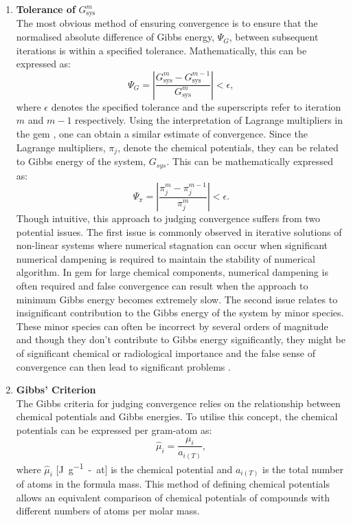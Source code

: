 	\begin{enumerate}
		\item \textbf{Tolerance of} $G_\text{sys}^m$\\
		The most obvious method of ensuring convergence is to ensure that the normalised absolute difference of Gibbs energy, $\Psi_G$, between subsequent iterations is within a specified tolerance. Mathematically, this can be expressed as:
		\begin{equation}\label{eqn:conv1}
			\Psi_G = \left \vert \frac{G_\text{sys}^{m} - G_\text{sys}^{m-1}}{G_\text{sys}^{m}} \right \vert < \epsilon,
		\end{equation}
		where $\epsilon$ denotes the specified tolerance and the superscripts refer to iteration $m$ and $m-1$ respectively. Using the interpretation of Lagrange multipliers in the \gls{gem} \cite{White:58}, one can obtain a similar estimate of convergence. Since the Lagrange multipliers, $\pi_{j}$, denote the chemical potentials, they can be related to Gibbs energy of the system, $G_{sys}$. This can be mathematically expressed as:
		\begin{equation}\label{eqn:conv2}
			\Psi_{\pi} = \left \vert \frac{\pi_{j}^{m} - \pi_{j}^{m-1}}{\pi_{j}^{m}} \right \vert < \epsilon.
		\end{equation}
		Though intuitive, this approach to judging convergence suffers from two potential issues. The first issue is commonly observed in iterative solutions of non-linear systems where numerical stagnation can occur when significant numerical dampening is required to maintain the stability of numerical algorithm. In \gls{gem} for large chemical components, numerical dampening is often required and false convergence can result when the approach to minimum Gibbs energy becomes extremely slow.  The second issue relates to insignificant contribution to the Gibbs energy of the system  by minor species. These minor species can often be incorrect by several orders of magnitude and though they don't contribute to Gibbs energy significantly, they might be of significant chemical or radiological importance and the false sense of convergence can then lead to significant problems \cite{Piro11a}.

		\item \textbf{Gibbs' Criterion}\\
	 The Gibbs criteria for judging convergence relies on the relationship between chemical potentials and Gibbs energies. To utilise this concept, the chemical potentials can be expressed per gram-atom as:
	 \begin{equation}
	 	\hat{\mu}_{i} = \frac{{\mu}_i}{a_{i(T)}},
	 \end{equation}
	 where $\hat{\mu}_{i}$ [\si{\joule \per g-at}] is the chemical potential and ${a_{i(T)}}$  is the total number of atoms in the formula mass. This method of defining chemical potentials allows an equivalent comparison of chemical potentials of compounds with different numbers of atoms per molar mass.


\end{enumerate}
